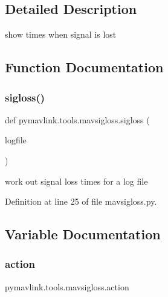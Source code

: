 \subsection{Detailed Description}
\begin{DoxyVerb}show times when signal is lost
\end{DoxyVerb}
 

\subsection{Function Documentation}
\mbox{\label{namespacepymavlink_1_1tools_1_1mavsigloss_a15d6bb0d2eb142440ea44a1feb3b7b8c}} 
\subsubsection{\texorpdfstring{sigloss()}{sigloss()}}
{\footnotesize\ttfamily def pymavlink.\+tools.\+mavsigloss.\+sigloss (\begin{DoxyParamCaption}\item[{}]{logfile }\end{DoxyParamCaption})}

\begin{DoxyVerb}work out signal loss times for a log file\end{DoxyVerb}
 

Definition at line 25 of file mavsigloss.\+py.



\subsection{Variable Documentation}
\mbox{\label{namespacepymavlink_1_1tools_1_1mavsigloss_ad5ed1d848b78690512c9985b9b047b59}} 
\subsubsection{\texorpdfstring{action}{action}}
{\footnotesize\ttfamily pymavlink.\+tools.\+mavsigloss.\+action}



